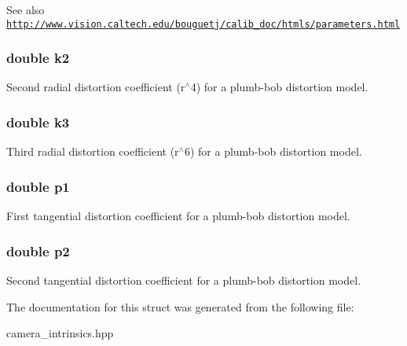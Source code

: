 \begin{DoxySeeAlso}{See also}
\href{http://www.vision.caltech.edu/bouguetj/calib_doc/htmls/parameters.html}{\tt http://www.vision.caltech.edu/bouguetj/calib\_\-doc/htmls/parameters.html} 
\end{DoxySeeAlso}
\hypertarget{structfovis_1_1CameraIntrinsicsParameters_a5fa2323820f58decc76532df11cd3ab8}{
\subsubsection[{k2}]{\setlength{\rightskip}{0pt plus 5cm}double {\bf k2}}}
\label{structfovis_1_1CameraIntrinsicsParameters_a5fa2323820f58decc76532df11cd3ab8}
Second radial distortion coefficient (r$^\wedge$4) for a plumb-\/bob distortion model. \hypertarget{structfovis_1_1CameraIntrinsicsParameters_a514147779f4e2774d6e0887cbf531c95}{
\subsubsection[{k3}]{\setlength{\rightskip}{0pt plus 5cm}double {\bf k3}}}
\label{structfovis_1_1CameraIntrinsicsParameters_a514147779f4e2774d6e0887cbf531c95}
Third radial distortion coefficient (r$^\wedge$6) for a plumb-\/bob distortion model. \hypertarget{structfovis_1_1CameraIntrinsicsParameters_afe3ec2bbc515ef1c2c03dccf567831f4}{
\subsubsection[{p1}]{\setlength{\rightskip}{0pt plus 5cm}double {\bf p1}}}
\label{structfovis_1_1CameraIntrinsicsParameters_afe3ec2bbc515ef1c2c03dccf567831f4}
First tangential distortion coefficient for a plumb-\/bob distortion model. \hypertarget{structfovis_1_1CameraIntrinsicsParameters_afb3d783e05c27da8ea3c53c9d2e17af1}{
\subsubsection[{p2}]{\setlength{\rightskip}{0pt plus 5cm}double {\bf p2}}}
\label{structfovis_1_1CameraIntrinsicsParameters_afb3d783e05c27da8ea3c53c9d2e17af1}
Second tangential distortion coefficient for a plumb-\/bob distortion model. 

The documentation for this struct was generated from the following file:\begin{DoxyCompactItemize}
\item 
camera\_\-intrinsics.hpp\end{DoxyCompactItemize}
